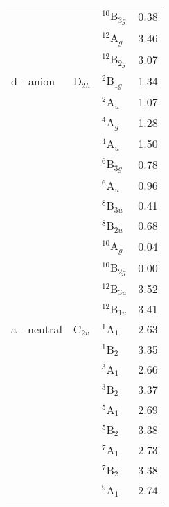 \begin{center}
\begin{longtable}{llll}
                &          & $^{10}$B$_{3g}$ & 0.38                 \\
                &          & $^{12}$A$_g$    & 3.46                 \\
                &          & $^{12}$B$_{2g}$ & 3.07                 \\ \midrule
    d - anion   & D$_{2h}$ & $^2$B$_{1g}$    & 1.34                 \\
                &          & $^2$A$_u$       & 1.07                 \\
                &          & $^4$A$_g$       & 1.28                 \\
                &          & $^4$A$_u$       & 1.50                 \\
                &          & $^6$B$_{3g}$    & 0.78                 \\
                &          & $^6$A$_u$       & 0.96                 \\
                &          & $^8$B$_{3u}$    & 0.41                 \\
                &          & $^8$B$_{2u}$    & 0.68                 \\
                &          & $^{10}$A$_g$    & 0.04                 \\
                &          & $^{10}$B$_{2g}$ & 0.00                 \\
                &          & $^{12}$B$_{3u}$ & 3.52                 \\
                &          & $^{12}$B$_{1u}$ & 3.41                 \\ \midrule
    a - neutral & C$_{2v}$ & $^1$A$_1$       & 2.63                 \\
                &          & $^1$B$_2$       & 3.35                 \\
                &          & $^3$A$_1$       & 2.66                 \\
                &          & $^3$B$_2$       & 3.37                 \\
                &          & $^5$A$_1$       & 2.69                 \\
                &          & $^5$B$_2$       & 3.38                 \\
                &          & $^7$A$_1$       & 2.73                 \\
                &          & $^7$B$_2$       & 3.38                 \\
                &          & $^9$A$_1$       & 2.74                 \\

\end{longtable}
\end{center}
